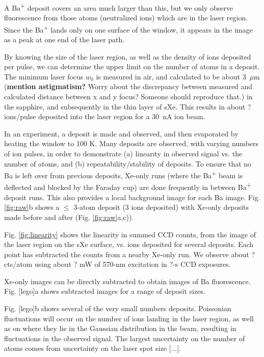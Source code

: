\documentclass[aps,pra,reprint,superscriptaddress]{revtex4-1}
\begin{document}
A Ba\textsuperscript{+} deposit covers an area much larger than this, but we only observe fluorescence from those atoms (neutralized ions) which are in the laser region.  Since the Ba\textsuperscript{+} lands only on one surface of the window, it appears in the image as a peak at one end of the laser path.

By knowing the size of the laser region, as well as the density of ions deposited per pulse, we can determine the upper limit on the number of atoms in a deposit.  The minimum laser focus $w_0$ is measured in air, and calculated to be about {\color{red}3~$\mu$m (\textbf{mention astigmatism?} Worry about the discrepancy between measured and calculated distance between x and y focus?  Someone should reproduce that.)} in the sapphire, and subsequently in the thin layer of sXe.  This results in about ? ions/pulse deposited into the laser region for a {\color{red}30~nA} ion beam.

In an experiment, a deposit is made and observed, and then evaporated by heating the window to 100 K.  Many deposits are observed, with varying numbers of ion pulses, in order to demonstrate (a) linearity in observed signal vs. the number of atoms, and (b) repeatability/stability of deposits.  To ensure that no Ba is left over from previous deposits, Xe-only runs (where the Ba\textsuperscript{+} beam is deflected and blocked by the Faraday cup) are done frequently in between Ba\textsuperscript{+} deposit runs.  This also provides a local background image for each Ba image.  Fig. \ref{fig:raw}b shows a $\leq$ 3-atom deposit (3 ions deposited) with Xe-only deposits made before and after (Fig. \ref{fig:raw}a,c)).

Fig. \ref{fig:linearity} shows the linearity in summed CCD counts, from the image of the laser region on the sXe surface, vs. ions deposited for several deposits.  Each point has subtracted the counts from a nearby Xe-only run.  We observe about ? cts/atom using about ? mW of 570-nm excitation in ?-s CCD exposures.

Xe-only images can be directly subtracted to obtain images of Ba fluorescence.  Fig. [lego]a shows subtracted images for a range of deposit sizes.  

Fig. [lego]b shows several of the very small numbers deposits.  Poissonian fluctuations will occur on the number of ions landing in the laser region, as well as on where they lie in the Gaussian distribution in the beam, resulting in fluctuations in the observed signal.  The largest uncertainty on the number of atoms comes from uncertainty on the laser spot size [...].
\end{document}
